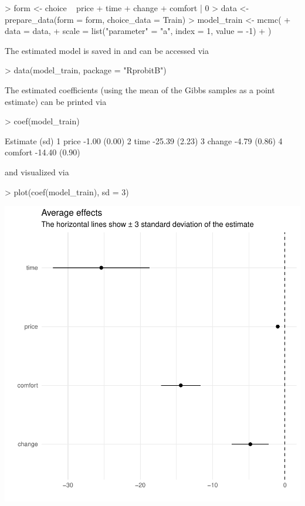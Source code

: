 \documentclass[article]{jss}
\begin{document}
\begin{Schunk}
\begin{Sinput}
> form <- choice ~ price + time + change + comfort | 0
> data <- prepare_data(form = form, choice_data = Train)
> model_train <- mcmc(
+    data = data,
+    scale = list("parameter" = "a", index = 1, value = -1)
+  )
\end{Sinput}
\end{Schunk}

The estimated model is saved in  and can be accessed via

\begin{Schunk}
\begin{Sinput}
> data(model_train, package = "RprobitB")
\end{Sinput}
\end{Schunk}

The estimated coefficients (using the mean of the Gibbs samples as a point estimate) can be printed via

\begin{Schunk}
\begin{Sinput}
> coef(model_train)
\end{Sinput}
\begin{Soutput}
           Estimate   (sd)
1   price     -1.00 (0.00)
2    time    -25.39 (2.23)
3  change     -4.79 (0.86)
4 comfort    -14.40 (0.90)
\end{Soutput}
\end{Schunk}

and visualized via

\begin{Schunk}
\begin{Sinput}
> plot(coef(model_train), sd = 3)
\end{Sinput}
\end{Schunk}
\includegraphics{rprobitb_oelschlaeger_bauer-plot-coef-model-train}
\end{document}
